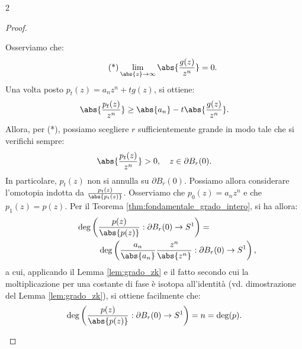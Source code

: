 \begin{multicols*}{2}
\begin{proof}
\begin{enumerate}[(1)]
                  Osserviamo che:
                  \begin{equation} \tag{*}
                      \lim_{\abs{z} \to \infty} \abs{\frac{g(z)}{z^n}} = 0.
                  \end{equation}
                  Una volta posto $p_t(z) = a_n z^n + t g(z)$, si ottiene:
                  \[
                      \abs{\frac{p_t(z)}{z^n}} \geq \abs{a_n} - t \abs{\frac{g(z)}{z^n}}.
                  \]
                  Allora, per (*), possiamo scegliere $r$ sufficientemente grande in modo tale che si verifichi sempre:
                  \[
                      \abs{\frac{p_t(z)}{z^n}} > 0, \quad z \in \partial B_r(0).
                  \]
                  In particolare, $p_t(z)$ non si annulla su $\partial B_r(0)$. Possiamo
                  allora considerare l'omotopia indotta da $\frac{p_t(z)}{\abs{p_t(z)}}$. Osserviamo che
                  $p_0(z) = a_n z^n$ e che $p_1(z) = p(z)$. Per il Teorema
                  \ref{thm:fondamentale_grado_intero}, si ha allora:
                  \[
                      \begin{split}
                          \deg\left( \frac{p(z)}{\abs{p(z)}} : \partial B_r(0) \to S^1 \right) = \hspace{2cm} \\
                          \hspace{2cm} \deg\left( \frac{a_n}{\abs{a_n}} \frac{z^n}{\abs{z^n}} : \partial B_r(0) \to S^1 \right),
                      \end{split}
                  \]
                  a cui, applicando il Lemma \ref{lem:grado_zk} e il fatto secondo cui la moltiplicazione per una costante di
                  fase è isotopa all'identità (vd. dimostrazione del Lemma \ref{lem:grado_zk}), si ottiene facilmente che:
                  \[
                      \deg\left( \frac{p(z)}{\abs{p(z)}} : \partial B_r(0) \to S^1 \right) = n = \deg(p).
                  \]


\end{enumerate}
\end{proof}
\end{multicols*}
